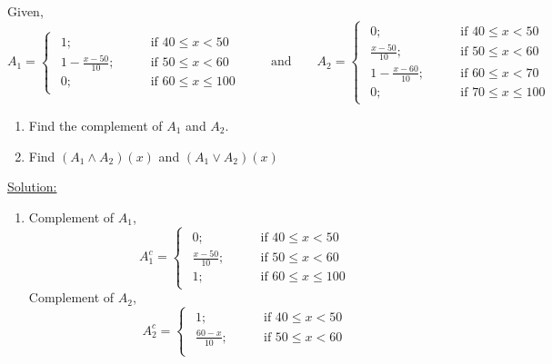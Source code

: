 \documentclass[../main-sheet.tex]{subfiles}
\begin{document}
\begin{ex}
    Given,
    \[
        A_1=\begin{cases}
            \begin{aligned}
                1; \qquad&\text{if }40\leq x<50\\
                1-\frac{x-50}{10}; \qquad&\text{if }50\leq x<60\\
                0; \qquad&\text{if }60\leq x\leq 100
            \end{aligned}
    \end{cases}
    \qquad\text{and}\qquad
    A_2=\begin{cases}
        \begin{aligned}
            0; \qquad&\text{if }40\leq x<50\\
            \frac{x-50}{10}; \qquad&\text{if }50\leq x<60\\
            1-\frac{x-60}{10}; \qquad&\text{if }60\leq x<70\\
            0; \qquad&\text{if }70\leq x\leq 100
        \end{aligned}
    \end{cases}
    \]
    \begin{enumerate}
        \item Find the complement of \(A_1\) and \(A_2\).
        \item Find \((A_1\wedge A_2)(x)\) and \((A_1\vee A_2)(x)\)
    \end{enumerate}
    \underline{Solution:}
    \begin{enumerate}
        \item Complement of \(A_1\),
        \[
            A_1^c=\begin{cases}
                \begin{aligned}
                    0; \qquad&\text{if }40\leq x<50\\
                    \frac{x-50}{10}; \qquad&\text{if }50\leq x<60\\
                    1; \qquad&\text{if }60\leq x\leq 100
                \end{aligned}
            \end{cases}
            \]
        Complement of \(A_2\),
        \[
            A_2^c=\begin{cases}
                \begin{aligned}
                    1; \qquad&\text{if }40\leq x<50\\
                    \frac{60-x}{10}; \qquad&\text{if }50\leq x<60\\

\end{aligned}
\end{cases}\]
\end{enumerate}
\end{ex}
\end{document}
